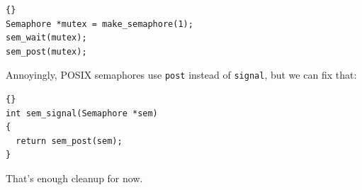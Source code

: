 \documentclass{book}
\begin{document}
\begin{latin}
\begin{lstlisting}[title={}]{}
Semaphore *mutex = make_semaphore(1);
sem_wait(mutex);
sem_post(mutex);
\end{lstlisting}
\end{latin}

Annoyingly, POSIX semaphores use {\tt post} instead of
{\tt signal}, but we can fix that:

\begin{latin}
\begin{lstlisting}[title={}]{}
int sem_signal(Semaphore *sem)
{
  return sem_post(sem);
}
\end{lstlisting}
\end{latin}

That's enough cleanup for now.
\end{document}
